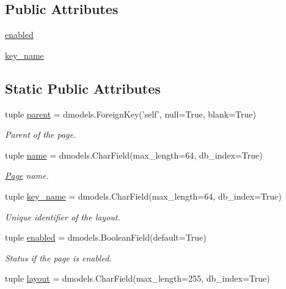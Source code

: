 \subsection*{Public Attributes}
\begin{DoxyCompactItemize}
\item 
\hyperlink{classcore_1_1models_1_1Page_acab3eb077ef1d77f01a48bff74c956df}{enabled}
\item 
\hyperlink{classcore_1_1models_1_1Page_a25178e4dfd9fafc8e1e6dea92ed53471}{key\-\_\-name}
\end{DoxyCompactItemize}
\subsection*{Static Public Attributes}
\begin{DoxyCompactItemize}
\item 
tuple \hyperlink{classcore_1_1models_1_1Page_a78ec187207c0e8f2c223693265a67482}{parent} = dmodels.\-Foreign\-Key('self', null=True, blank=True)
\begin{DoxyCompactList}\small\item\em Parent of the page. \end{DoxyCompactList}\item 
tuple \hyperlink{classcore_1_1models_1_1Page_a6d9d0e7d9e679e159e300f5664dc30f3}{name} = dmodels.\-Char\-Field(max\-\_\-length=64, db\-\_\-index=True)
\begin{DoxyCompactList}\small\item\em \hyperlink{classcore_1_1models_1_1Page}{Page} name. \end{DoxyCompactList}\item 
tuple \hyperlink{classcore_1_1models_1_1Page_a25178e4dfd9fafc8e1e6dea92ed53471}{key\-\_\-name} = dmodels.\-Char\-Field(max\-\_\-length=64, db\-\_\-index=True)
\begin{DoxyCompactList}\small\item\em Unique identifier of the layout. \end{DoxyCompactList}\item 
tuple \hyperlink{classcore_1_1models_1_1Page_acab3eb077ef1d77f01a48bff74c956df}{enabled} = dmodels.\-Boolean\-Field(default=True)
\begin{DoxyCompactList}\small\item\em Status if the page is enabled. \end{DoxyCompactList}\item 
tuple \hyperlink{classcore_1_1models_1_1Page_a2f5022d3c036a292307aa93776e9ef0a}{layout} = dmodels.\-Char\-Field(max\-\_\-length=255, db\-\_\-index=True)

\end{DoxyCompactItemize}
